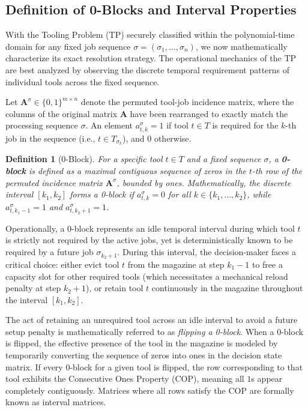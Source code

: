 \documentclass[11pt, a4paper]{book}
\newtheorem{definition}[theorem]{Definition}
\begin{document}
	\subsection{Definition of 0-Blocks and Interval Properties}
	
	With the Tooling Problem (TP) securely classified within the polynomial-time domain for any fixed job sequence $\sigma = (\sigma_1, \dots, \sigma_n)$, we now mathematically characterize its exact resolution strategy. The operational mechanics of the TP are best analyzed by observing the discrete temporal requirement patterns of individual tools across the fixed sequence.
	
	Let $\mathbf{A}^\sigma \in \{0,1\}^{m \times n}$ denote the permuted tool-job incidence matrix, where the columns of the original matrix $\mathbf{A}$ have been rearranged to exactly match the processing sequence $\sigma$. An element $a^\sigma_{t,k} = 1$ if tool $t \in T$ is required for the $k$-th job in the sequence (i.e., $t \in T_{\sigma_k}$), and $0$ otherwise.
	
	\begin{definition}[0-Block]
		For a specific tool $t \in T$ and a fixed sequence $\sigma$, a \textbf{0-block} is defined as a maximal contiguous sequence of zeros in the $t$-th row of the permuted incidence matrix $\mathbf{A}^\sigma$, bounded by ones. Mathematically, the discrete interval $[k_1, k_2]$ forms a 0-block if $a^\sigma_{t,k} = 0$ for all $k \in \{k_1, \dots, k_2\}$, while $a^\sigma_{t,k_1-1} = 1$ and $a^\sigma_{t,k_2+1} = 1$.
	\end{definition}
	
	Operationally, a 0-block represents an idle temporal interval during which tool $t$ is strictly not required by the active jobs, yet is deterministically known to be required by a future job $\sigma_{k_2+1}$. During this interval, the decision-maker faces a critical choice: either evict tool $t$ from the magazine at step $k_1 - 1$ to free a capacity slot for other required tools (which necessitates a mechanical reload penalty at step $k_2+1$), or retain tool $t$ continuously in the magazine throughout the interval $[k_1, k_2]$.
	
	The act of retaining an unrequired tool across an idle interval to avoid a future setup penalty is mathematically referred to as \textit{flipping a 0-block}. When a 0-block is flipped, the effective presence of the tool in the magazine is modeled by temporarily converting the sequence of zeros into ones in the decision state matrix. If every 0-block for a given tool is flipped, the row corresponding to that tool exhibits the Consecutive Ones Property (COP), meaning all $1$s appear completely contiguously. Matrices where all rows satisfy the COP are formally known as interval matrices.
	
\end{document}
